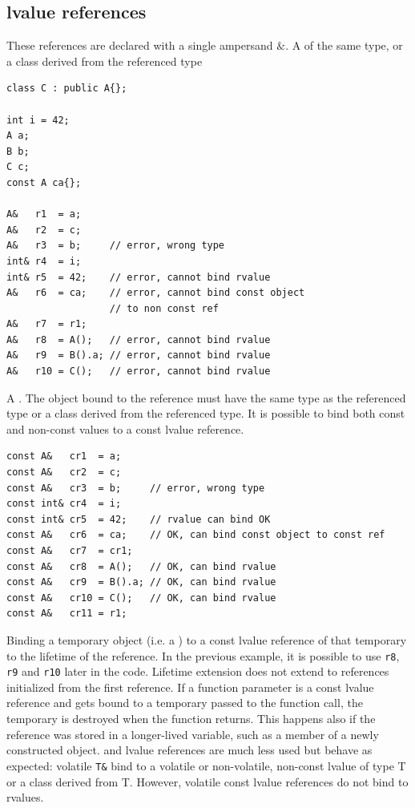 \subsection{lvalue references}
These references are declared with a single ampersand $\&$.
\newline
A  of the same type, or a class derived from the referenced type
\begin{lstlisting}[language=C+++]
class C : public A{};

int i = 42;
A a;
B b;
C c;
const A ca{};

A&   r1  = a;
A&   r2  = c;
A&   r3  = b;     // error, wrong type
int& r4  = i;
int& r5  = 42;    // error, cannot bind rvalue
A&   r6  = ca;    // error, cannot bind const object
                  // to non const ref
A&   r7  = r1;
A&   r8  = A();   // error, cannot bind rvalue
A&   r9  = B().a; // error, cannot bind rvalue
A&   r10 = C();   // error, cannot bind rvalue
\end{lstlisting}
A . The 
object bound to the reference must have the same type as the referenced 
type or a class derived from the referenced type. It is possible to 
bind both const and non-const values to a const lvalue reference.
\begin{lstlisting}[language=C+++]
const A&   cr1  = a;
const A&   cr2  = c;
const A&   cr3  = b;     // error, wrong type
const int& cr4  = i;
const int& cr5  = 42;    // rvalue can bind OK
const A&   cr6  = ca;    // OK, can bind const object to const ref
const A&   cr7  = cr1;
const A&   cr8  = A();   // OK, can bind rvalue
const A&   cr9  = B().a; // OK, can bind rvalue
const A&   cr10 = C();   // OK, can bind rvalue
const A&   cr11 = r1;
\end{lstlisting}
Binding a temporary object (i.e. a ) to a const lvalue 
reference  of that temporary to the 
lifetime of the reference. In the previous example, it is possible 
to use \texttt{r8}, \texttt{r9} and \texttt{r10} later in the code.
\newline
Lifetime extension does not extend to references initialized from the 
first reference. If a function parameter is a const lvalue reference 
and gets bound to a temporary passed to the function call, the temporary 
is destroyed when the function returns. This happens also if the 
reference was stored in a longer-lived variable, such as a member of a 
newly constructed object.
\newline
{} and  lvalue references are much 
less used but behave as expected: volatile \texttt{T\&} bind to a volatile or 
non-volatile, non-const lvalue of type T or a class derived from T. 
However, volatile const lvalue references do not bind to rvalues.

